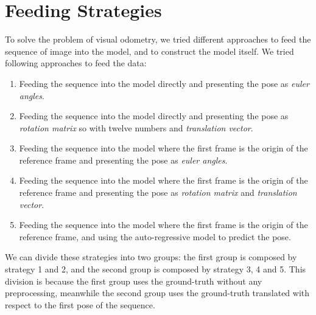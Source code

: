 \section{Feeding Strategies}\label{sec:prediction-strategies}
To solve the problem of visual odometry, we tried different approaches to feed the sequence of image into the model, and to construct the model itself.
We tried following approaches to feed the data:
\begin{enumerate}
    \item Feeding the sequence into the model directly and presenting the pose as \emph{euler angles}.
    \item Feeding the sequence into the model directly and presenting the pose as \emph{rotation matrix} so with twelve numbers and \emph{translation vector}.
    \item Feeding the sequence into the model where the first frame is the origin of the reference frame and presenting the pose as \emph{euler angles}.
    \item Feeding the sequence into the model where the first frame is the origin of the reference frame and presenting the pose as \emph{rotation matrix} and \emph{translation vector}.
    \item Feeding the sequence into the model where the first frame is the origin of the reference frame, and using the auto-regressive model to predict the pose.
\end{enumerate}
We can divide these strategies into two groups: the first group is composed by strategy 1 and 2, and the second group is composed by strategy 3, 4 and 5.
This division is because the first group uses the ground-truth without any preprocessing, meanwhile the second group uses the ground-truth translated with respect to the first pose of the sequence.

